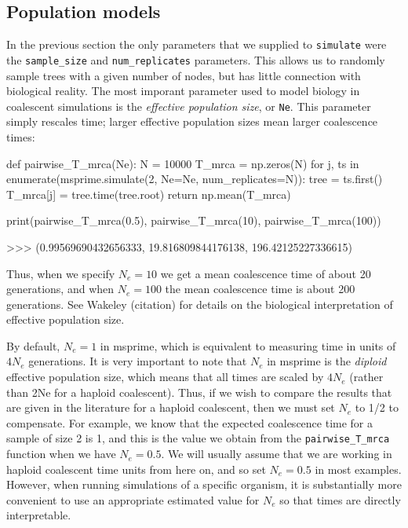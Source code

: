 \documentclass[graybox]{svmult}
\begin{document}
\subsection{Population models}\label{population-models}

In the previous section the only parameters that we supplied to
\texttt{simulate} were the \texttt{sample\_size} and
\texttt{num\_replicates} parameters. This allows us to randomly sample
trees with a given number of nodes, but has little connection with
biological reality. The most imporant parameter used to model biology in
coalescent simulations is the \emph{effective population size}, or
\texttt{Ne}. This parameter simply rescales time; larger effective
population sizes mean larger coalescence times:

\begin{pythoncode}
def pairwise_T_mrca(Ne):
    N = 10000
    T_mrca = np.zeros(N)
    for j, ts in enumerate(msprime.simulate(2, Ne=Ne, num_replicates=N)):
        tree = ts.first()
        T_mrca[j] = tree.time(tree.root)
    return np.mean(T_mrca)

print(pairwise_T_mrca(0.5), pairwise_T_mrca(10), pairwise_T_mrca(100))

>>> (0.99569690432656333, 19.816809844176138, 196.42125227336615)
\end{pythoncode}

    Thus, when we specify \(N_e=10\) we get a mean coalescence time of about
20 generations, and when \(N_e=100\) the mean coalescence time is about
200 generations. See Wakeley (citation) for details on the biological
interpretation of effective population size.

By default, \(N_e = 1\) in msprime, which is equivalent to measuring
time in units of \(4N_e\) generations. It is very important to note that
\(N_e\) in msprime is the \emph{diploid} effective population size,
which means that all times are scaled by \(4N_e\) (rather than 2Ne for a
haploid coalescent). Thus, if we wish to compare the results that are
given in the literature for a haploid coalescent, then we must set
\(N_e\) to 1/2 to compensate. For example, we know that the expected
coalescence time for a sample of size 2 is 1, and this is the value we
obtain from the \texttt{pairwise\_T\_mrca} function when we have
\(N_e=0.5\). We will usually assume that we are working in haploid
coalescent time units from here on, and so set \(N_e=0.5\) in most
examples. However, when running simulations of a specific organism, it
is substantially more convenient to use an appropriate estimated value
for \(N_e\) so that times are directly interpretable.
\end{document}
